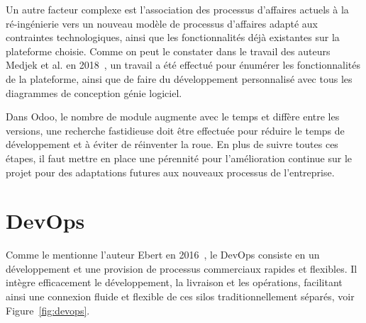 Un autre facteur complexe est l'association des processus d'affaires actuels à la ré-ingénierie vers un nouveau modèle de processus d'affaires adapté aux contraintes technologiques, ainsi que les fonctionnalités déjà existantes sur la plateforme choisie. Comme on peut le constater dans le travail des auteurs Medjek et al. en 2018~\cite{kenza2018conception}, un travail a été effectué pour énumérer les fonctionnalités de la plateforme, ainsi que de faire du développement personnalisé avec tous les diagrammes de conception génie logiciel.

Dans Odoo, le nombre de module augmente avec le temps et diffère entre les versions, une recherche fastidieuse doit être effectuée pour réduire le temps de développement et à éviter de réinventer la roue. En plus de suivre toutes ces étapes, il faut mettre en place une pérennité pour l’amélioration continue sur le projet pour des adaptations futures aux nouveaux processus de l'entreprise.






\section{DevOps}\label{devops_ref}

Comme le mentionne l'auteur Ebert en 2016~\cite{ebert2016devops}, le DevOps consiste en un développement et une provision de processus commerciaux rapides et flexibles. Il intègre efficacement le développement, la livraison et les opérations, facilitant ainsi une connexion fluide et flexible de ces silos traditionnellement séparés, voir Figure~\ref{fig:devops}.

